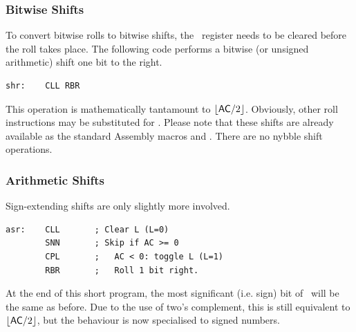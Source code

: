 %
%
%

\subsubsection{Bitwise Shifts}

To convert bitwise rolls to bitwise shifts, the \Lreg\ register needs
to be cleared before the roll takes place. The following code performs
a bitwise (or unsigned arithmetic) shift one bit to the right.

\begin{lstlisting}[language=cftasm]
shr:    CLL RBR
\end{lstlisting}

This operation is mathematically tantamount to
$\lfloor\mbox{\A}/2\rfloor$. Obviously, other roll instructions may be
substituted for . Please note that these shifts are already available
as the standard Assembly macros  and . There are no nybble
shift operations.

\subsubsection{Arithmetic Shifts}

Sign-extending shifts are only slightly more involved.

\begin{lstlisting}[language=cftasm]
asr:    CLL       ; Clear L (L=0)
        SNN       ; Skip if AC >= 0
        CPL       ;   AC < 0: toggle L (L=1)
        RBR       ;   Roll 1 bit right.
\end{lstlisting}

At the end of this short program, the most significant (i.e. sign) bit
of \A\ will be the same as before. Due to the use of two's complement,
this is still equivalent to $\lfloor\mbox{\A}/2\rfloor$, but the
behaviour is now specialised to signed numbers.

